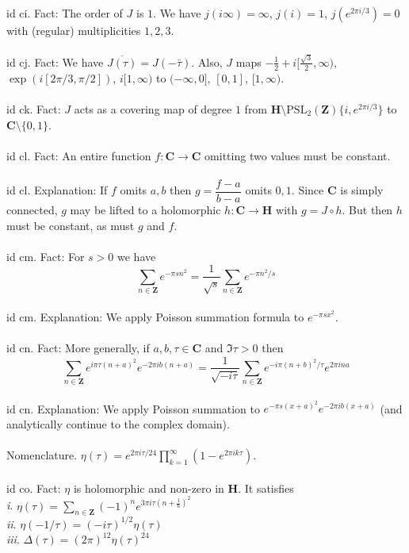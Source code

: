 \documentclass[oneside]{book}
\newcommand{\Z}{\mathbf{Z}}
\newcommand{\C}{\mathbf{C}}
\newcommand{\PSL}{\mathrm{PSL}}
\newcommand{\set}[1]{\{ #1\}}
\renewcommand{\i}{{\it i}. }
\newcommand{\ii}{{\it ii}. }
\newcommand{\iii}{{\it iii}. }
\renewcommand{\H}{\mathbf{H}}
\begin{document}
id ci. Fact: The order of $J$ is $1$. We have $j(i\infty)=\infty$, $j(i)=1$, $j(e^{2\pi i/3})=0$ with (regular) multiplicities $1,2,3$.\\\\


id cj. Fact: We have $\overline{J(\tau)}={J(-\bar{\tau})}$. Also, $J$ maps $-\frac{1}{2}+i[\frac{\sqrt{3}}{2},\infty)$, $\exp(i[2\pi/3,\pi/2])$, $i[1,\infty)$ to $(-\infty,0]$, $[0,1]$, $[1,\infty)$.\\\\


id ck. Fact: $J$ acts as a covering map of degree $1$ from $\H\setminus \PSL_2(\Z)\set{i,e^{2\pi i/3}}$ to $\C\setminus\set{0,1}$.\\\\


id cl. Fact: An entire function $f:\C\to\C$ omitting two values must be constant.\\\\


id cl. Explanation: If $f$ omits $a,b$ then $g=\dfrac{f-a}{b-a}$ omits $0,1$. Since $\C$ is simply connected, $g$ may be lifted to a holomorphic $h:\C\to\H$ with $g=J\circ h$. But then $h$ must be constant, as must $g$ and $f$.\\\\


id cm. Fact: For $s>0$ we have $$\sum_{n\in\Z}e^{-\pi s n^2}=\dfrac{1}{\sqrt{s}}\sum_{n\in\Z}e^{-\pi n^2/s}$$\\


id cm. Explanation: We apply Poisson summation formula to $e^{-\pi sx^2}$. \\\\


id cn. Fact: More generally, if $a,b,\tau\in\C$ and $\Im\tau>0$ then 
$$\sum_{n\in\Z}e^{i\pi \tau (n+a)^2}e^{-2\pi i b(n+a)}=\dfrac{1}{\sqrt{-i\tau}}\sum_{n\in\Z}e^{-i\pi (n+b)^2/\tau}e^{2\pi i na}$$\\


id cn. Explanation: We apply Poisson summation to $e^{-\pi s(x+a)^2}e^{-2\pi ib(x+a)}$ (and analytically continue to the complex domain).\\\\


Nomenclature. $\eta(\tau)=e^{2\pi i\tau/24}\displaystyle\prod_{k=1}^\infty (1-e^{2\pi ik\tau})$.\\\\


id co. Fact: $\eta$ is holomorphic and non-zero in $\H$. It satisfies \\
\i $\eta(\tau)=\sum_{n\in\Z}(-1)^n e^{3\pi i \tau(n+\frac{1}{6})^2}$\\
\ii $\eta(-1/\tau)=(-i\tau)^{1/2}\eta(\tau)$\\
\iii $\Delta(\tau)=(2\pi)^{12}\eta(\tau)^{24}$\\\\
\end{document}
